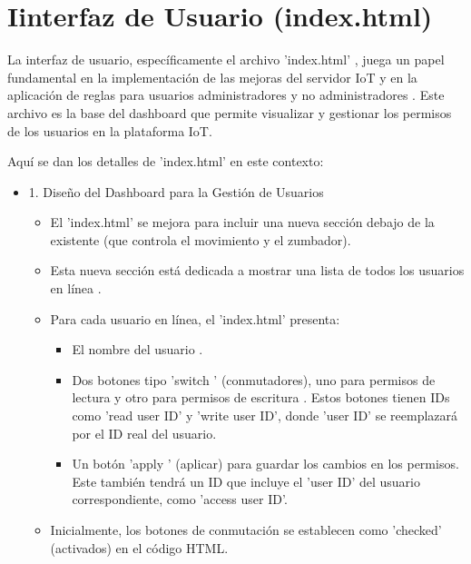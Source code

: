 \documentclass{report}
\begin{document}
\section{Iinterfaz de Usuario (index.html)}
La interfaz de usuario, específicamente el archivo  'index.html' , juega un papel fundamental en la implementación de las  mejoras del servidor IoT  
y en la aplicación de  reglas para usuarios administradores y no administradores . Este archivo es la base del  dashboard  que permite visualizar 
y gestionar los permisos de los usuarios en la plataforma IoT.

Aquí se dan los detalles de 'index.html' en este contexto:
\begin{itemize}
    \item 1. Diseño del Dashboard para la Gestión de Usuarios
    \begin{itemize}
        \item El 'index.html' se mejora para incluir una  nueva sección debajo de la existente  (que controla el movimiento y el zumbador).
        \item Esta nueva sección está dedicada a mostrar una  lista de todos los usuarios en línea .
        \item Para cada usuario en línea, el 'index.html' presenta:
        \begin{itemize}
            \item El  nombre del usuario .
            \item Dos botones tipo  'switch '  (conmutadores), uno para  permisos de lectura  y otro para  permisos de escritura . Estos botones tienen 
            IDs como 'read user ID' y 'write user ID', donde 'user ID' se reemplazará por el ID real del usuario.
            \item Un  botón  'apply '  (aplicar) para guardar los cambios en los permisos. Este también tendrá un ID que incluye el 'user ID' del 
            usuario correspondiente, como 'access user ID'.
        \end{itemize}
        \item Inicialmente, los botones de conmutación se establecen como 'checked' (activados) en el código HTML.
    \end{itemize}


\end{itemize}
\end{document}
